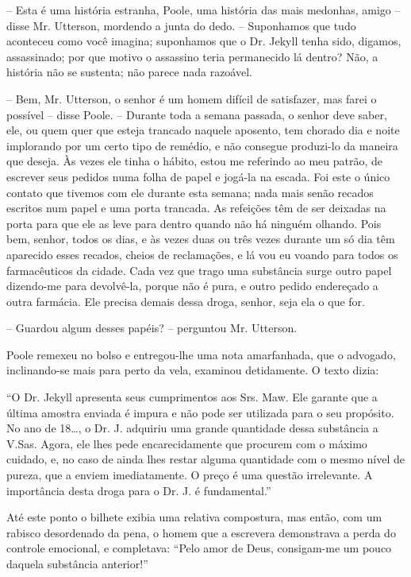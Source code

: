 -- Esta é uma história estranha, Poole, uma história das mais medonhas,
amigo -- disse Mr. Utterson, mordendo a junta do dedo. -- Suponhamos que
tudo aconteceu como você imagina; suponhamos que o Dr. Jekyll tenha
sido, digamos, assassinado; por que motivo o assassino teria
permanecido lá dentro? Não, a história não se sustenta; não parece nada
razoável.

-- Bem, Mr. Utterson, o senhor é um homem difícil de satisfazer, mas
farei o possível -- disse Poole. -- Durante toda a semana passada, o
senhor deve saber, ele, ou quem quer que esteja trancado naquele
aposento, tem chorado dia e noite implorando por um certo tipo de
remédio, e não consegue produzi-lo da maneira que deseja. Às vezes ele
tinha o hábito, estou me referindo ao meu patrão, de escrever seus
pedidos numa folha de papel e jogá-la na escada. Foi este o único
contato que tivemos com ele durante esta semana; nada mais senão
recados escritos num papel e uma porta trancada.  As refeições têm de
ser deixadas na porta para que ele as leve para dentro quando não há
ninguém olhando.  Pois bem, senhor, todos os dias, e às vezes duas ou
três vezes durante um só dia têm aparecido esses recados, cheios de
reclamações, e lá vou eu voando para todos os farmacêuticos da cidade. 
Cada vez que trago uma substância surge outro papel dizendo-me para
devolvê-la, porque não é pura, e outro pedido endereçado a outra
farmácia.  Ele precisa demais dessa droga, senhor, seja ela o que for.

-- Guardou algum desses papéis? -- perguntou Mr. Utterson.

Poole remexeu no bolso e entregou-lhe uma nota amarfanhada, que o
advogado, inclinando-se mais para perto da vela, examinou detidamente. 
O texto dizia:

“O Dr. Jekyll apresenta seus cumprimentos aos Srs. Maw.  Ele garante que
a última amostra enviada é impura e não pode ser utilizada para o seu
propósito.  No ano de 18\ldots{}, o Dr. J. adquiriu uma grande quantidade
dessa substância a V.Sas.  Agora, ele lhes pede encarecidamente que
procurem com o máximo cuidado, e, no caso de ainda lhes restar alguma
quantidade com o mesmo nível de pureza, que a enviem imediatamente.  O
preço é uma questão irrelevante.  A importância desta droga para o Dr.
J. é fundamental.”

Até este ponto o bilhete exibia uma relativa compostura, mas então, com
um rabisco desordenado da pena, o homem que a escrevera demonstrava a
perda do controle emocional, e completava: “Pelo amor de Deus,
consigam-me um pouco daquela substância anterior!”

